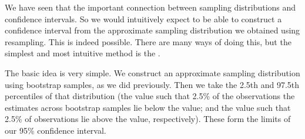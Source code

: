\documentclass[letterpaper,10pt,english]{jupyterBook}
\begin{document}
\sphinxAtStartPar
We have seen that the important connection between sampling distributions and confidence intervals. So we would intuitively expect to be able to construct a confidence interval from the approximate sampling distribution we obtained using resampling. This is indeed possible. There are many ways of doing this, but the simplest and most intuitive method is the .

\sphinxAtStartPar
The basic idea is very simple. We construct an approximate sampling distribution using bootstrap samples, as we did previously. Then we take the 2.5th and 97.5th percentiles of that distribution (the value such that 2.5\% of the observations \sphinxhyphen{} the estimates across bootstrap samples \sphinxhyphen{} lie below the value; and the value such that 2.5\% of observations lie above the value, respectively). These form the limits of our 95\% confidence interval.
\end{document}
